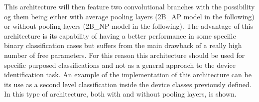 This architecture will then feature two convolutional branches with the possibility og them being either with average pooling layers (2B\_AP model in the following) or without pooling layers (2B\_NP model in the following). The advantage of this architecture is its capability of having a better performance in some specific binary classification cases but suffers from the main drawback of a really high number of free parameters. For this reason this architecture should be used for specific purposed classifications and not as a general approach to the device identification task. An example of the implementation of this architecture can be its use as a second level classification inside the device classes previously defined. 
In  this type of architecture, both with and without pooling layers, is shown.

